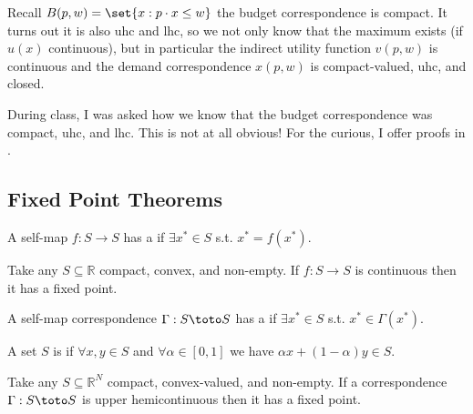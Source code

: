 \documentclass{article}
\begin{document}
Recall $B(p, w) = \set{x: p \cdot x \le w}$ the budget correspondence is compact. It turns out it is also uhc and lhc, so we not only know that the maximum exists (if $u(x)$ continuous), but in particular the indirect utility function $v(p, w)$ is continuous and the demand correspondence $x(p, w)$ is compact-valued, uhc, and closed.

\begin{remark}
  During class, I was asked how we know that the budget correspondence was compact, uhc, and lhc. This is not at all obvious! For the curious, I offer proofs in .
\end{remark}

\subsection{Fixed Point Theorems}
\label{sub:fixed_point_theorems}

\begin{definition}
  A self-map $f: S \to S$ has a  if $\exists x^* \in S$ s.t.  $x^* = f(x^*)$.
\end{definition}

\begin{theorem}
  Take any $S \subseteq \mathbb{R}$ compact, convex, and non-empty. If $f: S \to S$ is continuous then it has a fixed point.
\end{theorem}

\begin{definition}
  A self-map correspondence $\Gamma: S \toto S$ has a  if $\exists x^* \in S$ s.t.  $x^* \in \Gamma(x^*)$.
\end{definition}

\begin{definition}
  A set $S$ is  if $\forall x, y \in S$ and $\forall \alpha \in [0, 1]$ we have $\alpha x + (1 - \alpha) y \in S$.
\end{definition}

\begin{theorem}
  Take any $S \subseteq \mathbb{R}^N$ compact, convex-valued, and non-empty. If a correspondence $\Gamma: S \toto S$ is upper hemicontinuous then it has a fixed point.
\end{theorem}
\end{document}
